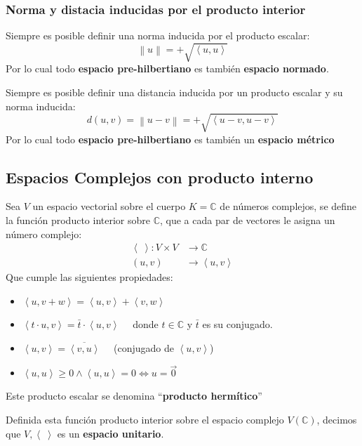 \subsubsection{Norma y distacia inducidas por el producto interior}

Siempre es posible definir una norma inducida por el producto escalar:
\[
\left\lVert u\right\rVert = + \sqrt{\left\langle u,u\right\rangle } 
\]
Por lo cual todo \textbf{espacio pre-hilbertiano} es también \textbf{espacio normado}.

Siempre es posible definir una distancia inducida por un producto escalar y su norma inducida:
\[
  d(u,v) = \left\lVert u-v\right\rVert = + \sqrt{\left\langle u-v, u-v\right\rangle } 
\]
Por lo cual todo \textbf{espacio pre-hilbertiano} es también un \textbf{espacio métrico}

\subsection{Espacios Complejos con producto interno}

Sea \(V\) un espacio vectorial sobre el cuerpo \(K=\mathbb{C}\) de números complejos, se define la función producto interior sobre \(\mathbb{C}\), que a cada par de vectores le asigna un número complejo:
\begin{align*}
  \left\langle ~ \right\rangle : V \times V &\rightarrow \mathbb{C} \\
  (u,v) &\rightarrow \left\langle u,v\right\rangle 
\end{align*}
Que cumple las siguientes propiedades:
\begin{itemize}
  \item \(\left\langle u, v+w\right\rangle = \left\langle u,v\right\rangle + \left\langle v,w\right\rangle\)
  \item \(\left\langle t \cdot u, v\right\rangle = \bar{t} \cdot \left\langle u,v\right\rangle \quad\) donde \(t\in \mathbb{C}\) y \(\bar{t}\) es su conjugado.
  \item \(\left\langle u,v\right\rangle = \overline{\left\langle v,u\right\rangle} \quad\) (conjugado de \(\left\langle u,v\right\rangle\))
  \item \(\left\langle u,u\right\rangle \geq 0 \land \left\langle u,u\right\rangle = 0 \Longleftrightarrow u=\vec{0}\)
\end{itemize}
Este producto escalar se denomina ``\textbf{producto hermítico}''

Definida esta función producto interior sobre el espacio complejo \(V(\mathbb{C})\), decimos que \(V, \left\langle ~ \right\rangle\) es un \textbf{espacio unitario}.

